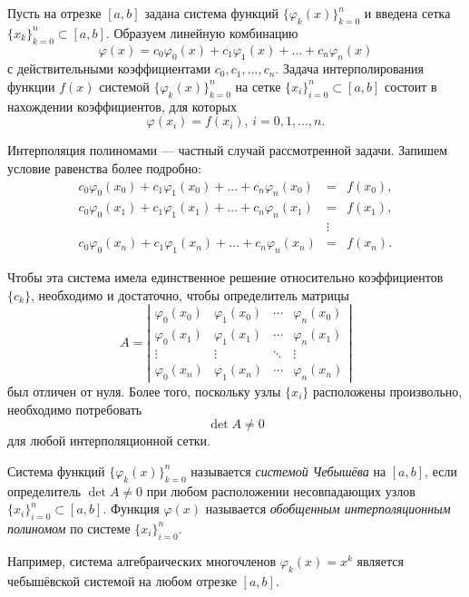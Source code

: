Пусть на отрезке $[a,b]$ задана система функций $\{\varphi_{k}(x)\}_{k=0}^{n}$
и введена сетка $\{x_{k}\}_{k=0}^{n}\subset[a,b]$. Образуем линейную
комбинацию
\[
\varphi(x)=c_{0}\varphi_{0}(x)+c_{1}\varphi_{1}(x)+\dots+c_{n}\varphi_{n}(x)
\]
с действительными коэффициентами $c_{0},c_{1},\dots,c_{n}$. Задача
интерполирования функции $f(x)$ системой $\{\varphi_{k}(x)\}_{k=0}^{n}$
на сетке $\{x_{i}\}_{i=0}^{n}\subset[a,b]$ состоит в нахождении коэффициентов,
для которых
\[
\varphi(x_{i})=f(x_{i}),\, i=0,1,\dots,n.
\]


Интерполяция полиномами --- частный случай рассмотренной задачи. Запишем
условие равенства более подробно:
\begin{eqnarray*}
c_{0}\varphi_{0}(x_{0})+c_{1}\varphi_{1}(x_{0})+\dots+c_{n}\varphi_{n}(x_{0}) & = & f(x_{0}),\\
c_{0}\varphi_{0}(x_{1})+c_{1}\varphi_{1}(x_{1})+\dots+c_{n}\varphi_{n}(x_{1}) & = & f(x_{1}),\\
 & \vdots\\
c_{0}\varphi_{0}(x_{n})+c_{1}\varphi_{1}(x_{n})+\dots+c_{n}\varphi_{n}(x_{n}) & = & f(x_{n}).
\end{eqnarray*}


Чтобы эта система имела единственное решение относительно коэффициентов
$\{c_{k}\}$, необходимо и достаточно, чтобы определитель матрицы
\[
A=\left|\begin{array}{cccc}
\varphi_{0}(x_{0}) & \varphi_{1}(x_{0}) & \cdots & \varphi_{n}(x_{0})\\
\varphi_{0}(x_{1}) & \varphi_{1}(x_{1}) & \cdots & \varphi_{n}(x_{1})\\
\vdots & \vdots & \ddots & \vdots\\
\varphi_{0}(x_{n}) & \varphi_{1}(x_{n}) & \cdots & \varphi_{n}(x_{n})
\end{array}\right|
\]
был отличен от нуля. Более того, поскольку узлы $\{x_{i}\}$ расположены
произвольно, необходимо потребовать
\[
\det A\neq0
\]
для любой интерполяционной сетки.

Система функций $\{\varphi_{k}(x)\}_{k=0}^{n}$ называется \emph{системой
Чебышёва} на $[a,b]$, если определитель $\det A\neq0$ при любом
расположении несовпадающих узлов $\{x_{i}\}_{i=0}^{n}\subset[a,b]$.
Функция $\varphi(x)$ называется \emph{обобщенным интерполяционным
полиномом} по системе $\{x_{i}\}_{i=0}^{n}$. 

Например, система алгебраических многочленов $\varphi_{k}(x)=x^{k}$
является чебышёвской системой на любом отрезке $[a,b]$.


